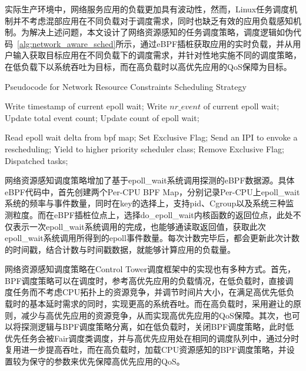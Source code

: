 实际生产环境中，网络服务应用的负载更加具有波动性，然而，Linux任务调度机制并不考虑混部应用在不同负载对于调度需求，同时也缺乏有效的应用负载感知机制。为解决上述问题，本文设计了网络资源感知的任务调度策略，调度逻辑如伪代码~\ref{alg:network_aware_sched}所示，通过eBPF插桩获取应用的实时负载，并从用户输入获取目标应用在不同负载下的调度需求，并针对性地实施不同的调度策略，在低负载下以系统吞吐为目标，而在高负载时以高优先应用的QoS保障为目标。

\begin{algorithm}[H]
    \caption{Pseudocode for Network Resource Constraints Scheduling Strategy}
    \label{alg:network_aware_sched}
    \begin{algorithmic}[1]

        \State Write timestamp of current epoll wait;
        \State Write $nr\_event$ of current epoll wait;
        \State Update total event count;
        \State Update count of epoll wait;
    \EndFunction

            \State Read epoll wait delta from bpf map;
                \State Set Exclusive Flag;
                    \State Send an IPI to envoke a rescheduling;
                \EndFor
                \State Yield to higher priority scheduler class;
            \EndIf
            \State Remove Exclusive Flag;
            \State Dispatched tasks;
        \EndWhile
    \EndFunction
    \end{algorithmic}
\end{algorithm}

网络资源感知调度策略增加了基于epoll\_wait系统调用探测的eBPF数据源。具体eBPF代码中，首先创建两个Per-CPU BPF Map，分别记录Per-CPU上epoll\_wait系统的频率与事件数量，同时在key的选择上，支持pid、Cgroup以及系统三种监测粒度。而在eBPF插桩位点上，选择do\_epoll\_wait内核函数的返回位点，此处不仅表示一次epoll\_wait系统调用的完成，也能够通读取返回值，获取此次epoll\_wait系统调用所得到的epoll事件数量。每次计数完毕后，都会更新此次计数的时间戳，结合计数与时间戳数据，就能够计算应用的负载量。

网络资源感知调度策略在Control Tower调度框架中的实现也有多种方式。首先，BPF调度策略可以在调度时，参考高优先应用的负载情况，在低负载时，直接调度任务而不考虑CPU拓扑上的资源竞争，并调节时间片大小，在满足高优先低负载时的基本延时需求的同时，实现更高的系统吞吐。而在高负载时，采用避让的原则，减少与高优先应用的资源竞争，从而实现高优先应用的QoS保障。其次，也可以将探测逻辑与BPF调度策略分离，如在低负载时，关闭BPF调度策略，此时低优先任务会被Fair调度类调度，并与高优先应用处在相同的调度队列中，通过分时复用进一步提高吞吐，而在高负载时，加载CPU资源感知的BPF调度策略，并设置较为保守的参数来优先保障高优先应用的QoS。

